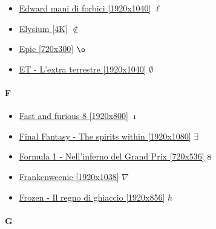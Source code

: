 		\begin{itemize}
			\item \href{https://mega.nz/#!HaZBDByR!P7eN5Umvbjj-i8EQqGi4RYhVemJrLTajUD3sr8VFLj4} {Edward mani di forbici [1920x1040]}  $\ell$ \\ 
			\item \href{https://mega.nz/#!nzBUQSLB!8OtPYu6HZWNI9e1hgBgpaQqWveRhrw_nWtQpwgHIVB8} {Elysium [4K]}  $\notin$ \\ 
			\item \href{https://mega.nz/#!htRH2SbK!2ZGgRA8SVdRzs-lBqMvIcuWeWv0ebA3XKEBhi1IfIjQ} {Epic [720x300]}  $\o$ \\ 
			\item \href{https://mega.nz/#!xWginCrB!dbn9ot8rzLCO1H-qJsBJjO2T1ZESw4TAF62u7d0sN3c} {ET - L'extra terrestre [1920x1040]}  $\emptyset$ \\ 
					
		\end{itemize}
	
	\paragraph{F} \hypertarget{FIF}{}
		\begin{itemize}
			
			\item \href{https://mega.nz/#!HjpTWJSS!UnKVKn6N8KAF6MD-SCZokH5g7KmeV98oj2mHJ-SEdTQ} {Fast and furious 8 [1920x800]}  $\imath$ \\ 
			\item \href{https://mega.nz/#!uqhCjCyK!RvLrZU4sfERM-nWG7ORTU-6dU7-rYFTtjAtNTMsWwpk} {Final Fantasy - The spirits within [1920x1080]}  $\exists$ \\ 
			\item \href{https://mega.nz/#!j7QgBKrA!OM7TeH8gXvR48bv3lYOTJQER8GC_0mQC-uSmeFUu93U} {Formula 1 - Nell'inferno del Grand Prix [720x536]}  $\oldstylenums{8}$ \\
			\item \href{https://mega.nz/#!bLASHIAI!AqKiZ177EuAgWhfa913fWmX4NxKBYE-B4YDFMx410Kk} {Frankenweenie [1920x1038]}  $\nabla$ \\ 
			\item \href{https://mega.nz/#!vjA1ABLT!PQ7h4N6kSeu7V5Ql4dvJTHWvye1Lo7KGkG9MH_i0Vec} {Frozen - Il regno di ghiaccio [1920x856]}  $\hbar$ \\ 
				
	\end{itemize}
	
	
	\paragraph{G} \hypertarget{FIG}{}
	
